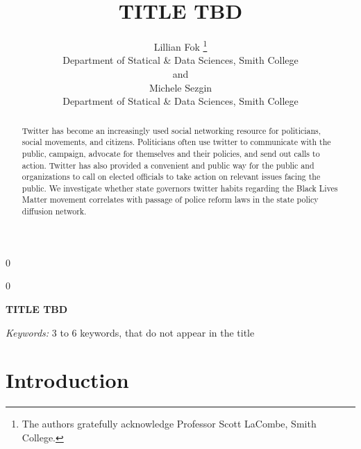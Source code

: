 \documentclass[12pt]{article}
\newcommand{\blind}{0}
\begin{document}
\def\spacingset#1{\renewcommand{\baselinestretch}%
{#1}\small\normalsize} \spacingset{1}



\blind
{
  \title{\bf TITLE TBD}

  \author{
        Lillian Fok \thanks{The authors gratefully acknowledge Professor
Scott LaCombe, Smith College.} \\
    Department of Statical \& Data Sciences, Smith College\\
     and \\     Michele Sezgin \\
    Department of Statical \& Data Sciences, Smith College\\
      }
  \maketitle
} \fi

\blind
{
  \bigskip
  \bigskip
  \bigskip
  \begin{center}
    {\LARGE\bf TITLE TBD}
  \end{center}
  \medskip
} \fi

\bigskip
\begin{abstract}
Twitter has become an increasingly used social networking resource for
politicians, social movements, and citizens. Politicians often use
twitter to communicate with the public, campaign, advocate for
themselves and their policies, and send out calls to action. Twitter has
also provided a convenient and public way for the public and
organizations to call on elected officials to take action on relevant
issues facing the public. We investigate whether state governors twitter
habits regarding the Black Lives Matter movement correlates with passage
of police reform laws in the state policy diffusion network.
\end{abstract}

\noindent%
{\it Keywords:} 3 to 6 keywords, that do not appear in the title
\vfill

\newpage
\spacingset{1.45} %

\hypertarget{introduction}{%
\section{Introduction}\label{introduction}}
\end{document}
